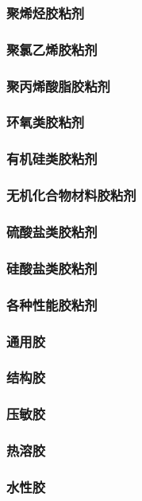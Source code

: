 \documentclass[UTF8]{../../ApplicationUniverse}
\begin{document}
            \subsubsection{聚烯烃胶粘剂}
            \subsubsection{聚氯乙烯胶粘剂}
            \subsubsection{聚丙烯酸脂胶粘剂}
            \subsubsection{环氧类胶粘剂}
            \subsubsection{有机硅类胶粘剂}
    \subsubsection{无机化合物材料胶粘剂}
        \subsubsection{硫酸盐类胶粘剂}
        \subsubsection{硅酸盐类胶粘剂}
\subsubsection{各种性能胶粘剂}
    \subsubsection{通用胶}
    \subsubsection{结构胶}
    \subsubsection{压敏胶}
    \subsubsection{热溶胶}
    \subsubsection{水性胶}
\end{document}
